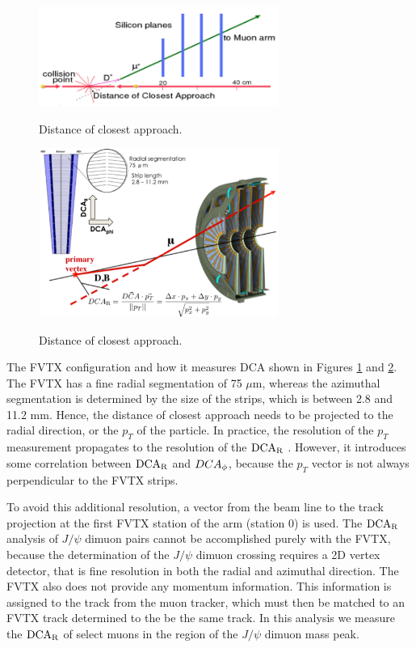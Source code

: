\documentclass[12pt]{article}
\newcommand{\pt}{$p_{T}$ }
\newcommand{\jpsi}{$J/\psi$ }
\newcommand{\dcar}{$\rm{DCA}_{R}$ }
\begin{document}
\begin{figure}[h]
\begin{center}
\includegraphics[width=0.7\textwidth,angle=0]{figures/DCA}
\\ \caption{Distance of closest approach.}
\label{fig:DCA}
\end{center}
\end{figure}

\begin{figure}[h]
\begin{center}
\includegraphics[width=0.7\textwidth,angle=0]{figures/FVTX_DCA_def}
\\ \caption{Distance of closest approach.}
\label{fig:DCA_2}
\end{center}
\end{figure}


The FVTX configuration and how it measures DCA shown in Figures \ref{fig:DCA} and \ref{fig:DCA_2}. The FVTX has a fine radial segmentation of 75 $\mu$m, 
whereas the azimuthal segmentation is determined by the size of the strips, which is between 2.8 and 11.2 mm. Hence, the distance of closest approach needs 
to be projected to the radial direction, or the \pt of the particle. In practice, the resolution of the \pt measurement propagates to the resolution of the \dcar. 
However, it introduces some correlation between \dcar and $DCA_{\rm \phi}$, because the \pt vector is not always perpendicular to the FVTX strips. 

To avoid this additional resolution, a vector from the beam line to the track projection at the first FVTX station of the arm (station 0) is used.
The \dcar analysis of \jpsi dimuon pairs cannot be accomplished purely with the FVTX, because the determination of the \jpsi dimuon crossing requires a 2D vertex detector, that is fine 
resolution in both the radial and azimuthal direction.  The FVTX also does not provide any momentum information.  This information is assigned to the track from the muon tracker, which 
must then be matched to an FVTX track determined to the be the same track. In this analysis we measure the \dcar of select muons in the region of the \jpsi dimuon mass peak. 
\end{document}
